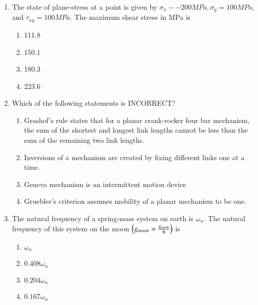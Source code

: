 \documentclass[journal]{IEEEtran}
\begin{document}
\begin{enumerate}
		
    \item The state of plane-stress at a point is given by $\sigma_x--200MPa,\sigma_y=100MPa$, and $\tau_{xy}=100MPa$. The maximum shear stress in MPa is

        \begin{multicols}{4}
            \begin{enumerate}
                \item 111.8
                \item 150.1
                \item 180.3
                \item 223.6
            \end{enumerate}
        \end{multicols}

    \item Which of the following statements is INCORRECT?


            \begin{enumerate}
                \item Grashof's rule states that for a planar crank-rocker four bar mechanism, the sum of the shortest and longest link lengths cannot be less than the sum of the remaining two link lengths.
                \item Inversions of a mechanism are created by fixing different links one at a time.
                \item Geneva mechanism is an intermittent motion device
                \item Gruebler's criterion assumes mobility of a planar mechanism to be one.
            \end{enumerate}


    \item The natural frequency of a spring-mass system on earth is $\omega_n$. The natural frequency of this system on the moon $\left(g_{moon}=\frac{g_{earth}}{6}\right)$ is

        \begin{multicols}{4}
            \begin{enumerate}
                \item $\omega_n$
                \item $0.408\omega_n$
                \item $0.204\omega_n$
                \item $0.167\omega_n$
            \end{enumerate}
        \end{multicols}
        

\end{enumerate}
\end{document}
